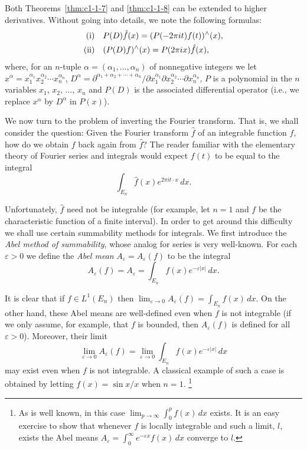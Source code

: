 Both Theorems~\ref{thm:c1-1-7} and \ref{thm:c1-1-8} can be extended to higher
derivatives. Without going into details, we note the following formulas:
\begin{equation}\label{eq:c1-1-9}
\begin{aligned}
\textup{(i)}\quad &P(D)\hat{f}(x)=(P(-2\pi i t)f(t))^{\wedge}(x),\\
\textup{(ii)}\quad &(P(D)f)^{\wedge}(x)=P(2\pi i x)\hat{f}(x),
\end{aligned}
\end{equation}
where, for an $n$-tuple $\alpha = (\alpha_{1}, \ldots, \alpha_{n})$ of
nonnegative integers we let
$x^{\alpha} = x_{1}^{\alpha_{1}} x_{2}^{\alpha_{2}} \cdots x_{n}^{\alpha_{n}}$,
$D^{\alpha} = \partial^{\alpha_{1} + \alpha_{2} + \cdots + \alpha_{n}} / \partial x_{1}^{\alpha_{1}} \partial x_{2}^{\alpha_{2}} \cdots \partial x_{n}^{\alpha_{n}}$,
$P$ is a polynomial in the $n$ variables $x_{1}$, $x_{2}$, $\ldots$, $x_{n}$
and $P(D)$ is the associated differential operator (i.e., we replace $x^{\alpha}$
by $D^{\alpha}$ in $P(x)$).

We now turn to the problem of inverting the Fourier transform. That is, we
shall consider the question: Given the Fourier transform $\hat{f}$ of an
integrable function $f$, how do we obtain $f$ back again from $\hat{f}$? The
reader familiar with the elementary theory of Fourier series and integrals would
expect $f(t)$ to be equal to the integral
\begin{equation}\label{eq:c1-1-10}
\int_{E_{n}}\hat{f}(x)e^{2\pi i t\cdot x}\,dx.
\end{equation}

Unfortunately, $\hat{f}$ need not be integrable (for example, let $n = 1$ and
$f$ be the characteristic function of a finite interval). In order to get around
this difficulty we shall use certain summability methods for integrals. We first
introduce the \textit{Abel method of summability}, whose analog for series is very
well-known. For each $\varepsilon > 0$ we define the \textit{Abel mean}
$A_{\varepsilon} = A_{\varepsilon}(f)$ to be the integral
\[
A_{\varepsilon}(f)=A_{\varepsilon}=\int_{E_{n}}f(x)e^{-\varepsilon|x|}\,dx.
\]

It is clear that if $f \in L^{1}(E_{n})$ then
$\lim_{\varepsilon \to 0} A_{\varepsilon}(f) = \int_{E_{n}} f(x) \, dx$. On the
other hand, these Abel means are well-defined even when $f$ is not integrable
(if we only assume, for example, that $f$ is bounded, then
$A_{\varepsilon}(f)$ is defined for all $\varepsilon > 0$). Moreover, their
limit
\begin{equation}\label{eq:c1-1-11}
\lim_{\varepsilon\to0}A_{\varepsilon}(f)
=\lim_{\varepsilon\to0}\int_{E_{n}}f(x)e^{-\varepsilon|x|}\,dx
\end{equation}
may exist even when $f$ is not integrable. A classical example of such a case is
obtained by letting $f(x) = \sin x/x$ when $n = 1$.%
\footnote{As is well known, in this case
$\lim_{p\to\infty}\int_{0}^{p}f(x)\,dx$ exists. It is an easy exercise to show
that whenever $f$ is locally integrable and such a limit, $l$, exists the Abel
means $A_{\varepsilon}=\int_{0}^{\infty}e^{-\varepsilon x}f(x)\,dx$ converge to
$l$.}

